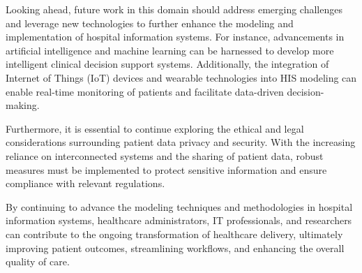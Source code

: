 Looking ahead, future work in this domain should address emerging challenges and leverage new technologies to further enhance the modeling and implementation of hospital information systems. For instance, advancements in artificial intelligence and machine learning can be harnessed to develop more intelligent clinical decision support systems. Additionally, the integration of Internet of Things (IoT) devices and wearable technologies into HIS modeling can enable real-time monitoring of patients and facilitate data-driven decision-making.

Furthermore, it is essential to continue exploring the ethical and legal considerations surrounding patient data privacy and security. With the increasing reliance on interconnected systems and the sharing of patient data, robust measures must be implemented to protect sensitive information and ensure compliance with relevant regulations.

By continuing to advance the modeling techniques and methodologies in hospital information systems, healthcare administrators, IT professionals, and researchers can contribute to the ongoing transformation of healthcare delivery, ultimately improving patient outcomes, streamlining workflows, and enhancing the overall quality of care.

\let\cleardoublepage\clearpage

